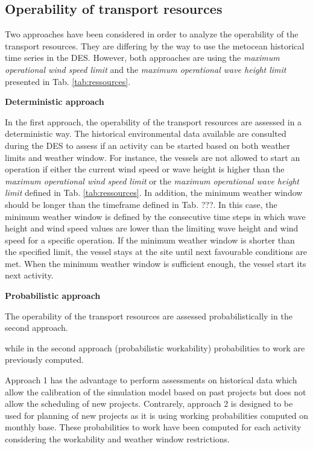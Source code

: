 \subsection{Operability of transport resources}
Two approaches have been considered in order to analyze the operability of the transport resources. They are differing by the way to use the metocean historical time series in the DES. However, both approaches are using the \textit{maximum operational wind speed limit} and the \textit{maximum operational wave height limit} presented in Tab. \ref{tab:ressources}.

\textbf{Deterministic approach}

In the first approach, the operability of the transport resources are assessed in a deterministic way. The historical environmental data available are consulted during the DES to assess if an activity can be started based on both weather limits and weather window. For instance, the vessels are not allowed to start an operation if either the current wind speed or wave height is higher than the \textit{maximum operational wind speed limit} or the \textit{maximum operational wave height limit} defined in Tab. \ref{tab:ressources}. In addition, the minimum weather window should be longer than the timeframe defined in Tab. ???. In this case, the minimum weather window is defined by the consecutive time steps in which wave height and wind speed values are lower than the limiting wave height and wind speed for a specific operation. If the minimum weather window is shorter than the specified limit, the vessel stays at the site until next favourable conditions are met. When the minimum weather window is sufficient enough, the vessel start its next activity. 

\textbf{Probabilistic approach}

The operability of the transport resources are assessed probabilistically in the second approach. 


while in the second approach (probabilistic workability) probabilities to work are previously computed.

Approach 1 has the advantage to perform assessments on historical data which allow the calibration of the simulation model based on past projects but does not allow the scheduling of new projects. Contrarely, approach 2 is designed to be used for planning of new projects as it is using working probabilities computed on monthly base. These probabilities to work have been computed for each activity considering the workability and weather window restrictions.






